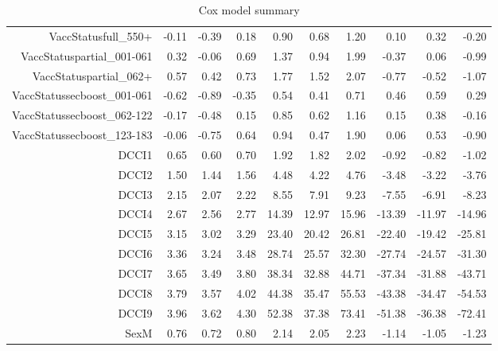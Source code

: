 \begin{table}[ht]
\begin{tabular}{rrrrrrrrrr}
  VaccStatusfull\_550+ & -0.11 & -0.39 & 0.18 & 0.90 & 0.68 & 1.20 & 0.10 & 0.32 & -0.20 \\ 
  VaccStatuspartial\_001-061 & 0.32 & -0.06 & 0.69 & 1.37 & 0.94 & 1.99 & -0.37 & 0.06 & -0.99 \\ 
  VaccStatuspartial\_062+ & 0.57 & 0.42 & 0.73 & 1.77 & 1.52 & 2.07 & -0.77 & -0.52 & -1.07 \\ 
  VaccStatussecboost\_001-061 & -0.62 & -0.89 & -0.35 & 0.54 & 0.41 & 0.71 & 0.46 & 0.59 & 0.29 \\ 
  VaccStatussecboost\_062-122 & -0.17 & -0.48 & 0.15 & 0.85 & 0.62 & 1.16 & 0.15 & 0.38 & -0.16 \\ 
  VaccStatussecboost\_123-183 & -0.06 & -0.75 & 0.64 & 0.94 & 0.47 & 1.90 & 0.06 & 0.53 & -0.90 \\ 
  DCCI1 & 0.65 & 0.60 & 0.70 & 1.92 & 1.82 & 2.02 & -0.92 & -0.82 & -1.02 \\ 
  DCCI2 & 1.50 & 1.44 & 1.56 & 4.48 & 4.22 & 4.76 & -3.48 & -3.22 & -3.76 \\ 
  DCCI3 & 2.15 & 2.07 & 2.22 & 8.55 & 7.91 & 9.23 & -7.55 & -6.91 & -8.23 \\ 
  DCCI4 & 2.67 & 2.56 & 2.77 & 14.39 & 12.97 & 15.96 & -13.39 & -11.97 & -14.96 \\ 
  DCCI5 & 3.15 & 3.02 & 3.29 & 23.40 & 20.42 & 26.81 & -22.40 & -19.42 & -25.81 \\ 
  DCCI6 & 3.36 & 3.24 & 3.48 & 28.74 & 25.57 & 32.30 & -27.74 & -24.57 & -31.30 \\ 
  DCCI7 & 3.65 & 3.49 & 3.80 & 38.34 & 32.88 & 44.71 & -37.34 & -31.88 & -43.71 \\ 
  DCCI8 & 3.79 & 3.57 & 4.02 & 44.38 & 35.47 & 55.53 & -43.38 & -34.47 & -54.53 \\ 
  DCCI9 & 3.96 & 3.62 & 4.30 & 52.38 & 37.38 & 73.41 & -51.38 & -36.38 & -72.41 \\ 
  SexM & 0.76 & 0.72 & 0.80 & 2.14 & 2.05 & 2.23 & -1.14 & -1.05 & -1.23 \\ 
   \hline
\end{tabular}
\caption{Cox model summary} 
\end{table}
